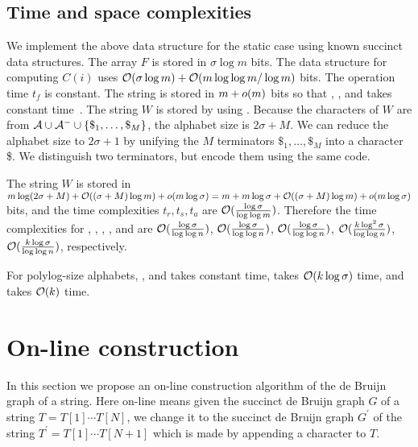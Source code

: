 \subsection{Time and space complexities}
We implement the above data structure for the static case using known succinct data structures.
The array $F$ is stored in $\sigma \log m$ bits.  The data structure for computing $C(i)$
uses $\mathcal{O}(\sigma \log m) + \mathcal{O}(m \log \log m/\log m)$ bits.  The operation time $t_f$ is constant.
The string {\last} is stored in $m+o(m)$ bits so that {\rank}, {\select}, and {\access} takes constant 
time~\cite{RRR07}.  The string $W$ is stored by using \cite{FerManMakNav06}.  
Because the characters
of $W$ are from ${\cal A} \cup {\cal A}^- \cup \{\$_1,\ldots,\$_M\}$, 
the alphabet size is $2\sigma + M$.
%
We can reduce the alphabet size to $2\sigma+1$ by unifying the $M$ terminators
$\$_1,\ldots,\$_M$ into a character \$.  We distinguish two terminators, but
encode them using the same code.

The string $W$ is stored in $m \log (2\sigma+M) +
\mathcal{O}((\sigma+M) \log m) + o(m \log\sigma)
 = m + m \log\sigma + \mathcal{O}((\sigma+M) \log m) + o(m \log\sigma)$ bits,
and the time complexities $t_r, t_s, t_a$ are 
$\mathcal{O}(\frac{\log\sigma}{\log\log m})$.
Therefore the time complexities for {\cdeg}, {\pdeg}, {\child}, {\parent},
and {\search} are $\mathcal{O}(\frac{\log\sigma}{\log\log n})$, 
$\mathcal{O}(\frac{\log\sigma}{\log\log n})$, 
$\mathcal{O}(\frac{\log\sigma}{\log\log n})$, 
$\mathcal{O}(\frac{k\log^2\sigma}{\log\log n})$,
$\mathcal{O}(\frac{k\log\sigma}{\log\log n})$, respectively.

For polylog-size alphabets, {\cdeg}, {\pdeg} and {\child} takes constant time,
{\parent} takes $\mathcal{O}(k \log \sigma)$ time,
and {\search} takes $\mathcal{O}(k)$ time.



\section{On-line construction}
In this section we propose an on-line construction algorithm of the de Bruijn graph of a string.
Here on-line means given the succinct de Bruijn graph $G$ of a string $T = T[1] \cdots T[N]$, we change it
to the succinct de Bruijn graph $G^\prime$ of the string $T^\prime = T[1] \cdots T[N+1]$ which is made by
appending a character to $T$.
%

